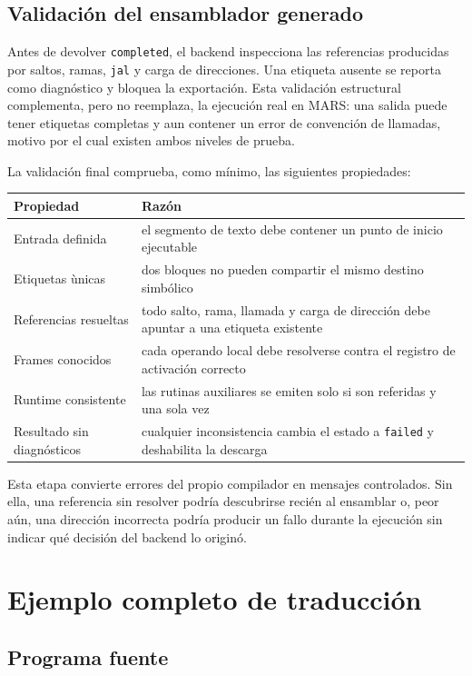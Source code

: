\documentclass[11pt,letterpaper,oneside]{report}
\newcommand{\codigo}[1]{\texttt{#1}}
\begin{document}
\section{Validaci\'on del ensamblador generado}

Antes de devolver \codigo{completed}, el backend inspecciona las referencias producidas por saltos, ramas, \codigo{jal} y carga de direcciones. Una etiqueta ausente se reporta como diagn\'ostico y bloquea la exportaci\'on. Esta validaci\'on estructural complementa, pero no reemplaza, la ejecuci\'on real en MARS: una salida puede tener etiquetas completas y aun contener un error de convenci\'on de llamadas, motivo por el cual existen ambos niveles de prueba.

La validaci\'on final comprueba, como m\'inimo, las siguientes propiedades:

\begin{longtable}{p{4cm}p{8.8cm}}
\toprule
Propiedad & Raz\'on\\\midrule
\endhead
Entrada definida & el segmento de texto debe contener un punto de inicio ejecutable\\
Etiquetas \`unicas & dos bloques no pueden compartir el mismo destino simb\'olico\\
Referencias resueltas & todo salto, rama, llamada y carga de direcci\'on debe apuntar a una etiqueta existente\\
Frames conocidos & cada operando local debe resolverse contra el registro de activaci\'on correcto\\
Runtime consistente & las rutinas auxiliares se emiten solo si son referidas y una sola vez\\
Resultado sin diagn\'osticos & cualquier inconsistencia cambia el estado a \codigo{failed} y deshabilita la descarga\\
\bottomrule
\end{longtable}

Esta etapa convierte errores del propio compilador en mensajes controlados. Sin ella, una referencia sin resolver podr\'ia descubrirse reci\'en al ensamblar o, peor a\'un, una direcci\'on incorrecta podr\'ia producir un fallo durante la ejecuci\'on sin indicar qu\'e decisi\'on del backend lo origin\'o.

\chapter{Ejemplo completo de traducci\'on}

\section{Programa fuente}
\end{document}
